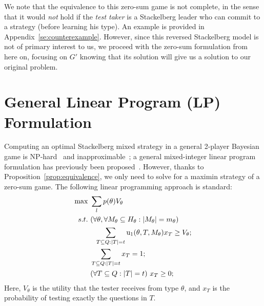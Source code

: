 \documentclass{article}
\begin{document}
We note that the equivalence to this zero-sum game is not complete, in the
sense that it would {\em not} hold if the {\em test taker} is a Stackelberg
leader who can commit to a strategy (before learning his type).  An example
is provided in Appendix~\ref{se:counterexample}.  However, since this
reversed Stackelberg model is not of primary interest to
us, we proceed with the zero-sum formulation from here on, focusing on $G'$
knowing that its solution will give us a solution to our original problem.


\section{General Linear Program (LP) Formulation}

Computing an optimal Stackelberg mixed strategy in a general 2-player
Bayesian game is NP-hard~\cite{Conitzer06:Computing} and
inapproximable~\cite{Letchford09:Learning}; a general mixed-integer linear
program formulation has previously been
proposed~\cite{Paruchuri08:Playing}.
However, thanks to Proposition~\ref{prop:equivalence}, we only need to
solve for a maximin strategy of a zero-sum game.  The following linear
programming approach is standard:
\begin{align}\label{eqn:maximin}
	\max~ &\sum_l p(\theta) V_\theta \\
	s.t. \ &(\forall \theta, \forall M_\theta \subseteq H_\theta
        : |M_\theta| = m_\theta)\nonumber\\
	&~~ \sum_{T \subseteq Q: |T| = t} \text  u_1(\theta, T, M_\theta) x_T \geq V_\theta;\nonumber\\
	&\sum_{T \subseteq Q: |T| = t} x_T = 1;\nonumber\\
	&(\forall T \subseteq Q: |T| = t) \  x_T \geq 0;\nonumber
\end{align}
Here, $V_\theta$ is the utility that the tester receives from type
$\theta$, and $x_T$ is the probability of testing exactly the questions in
$T$.
%
%
%
% 
\end{document}
